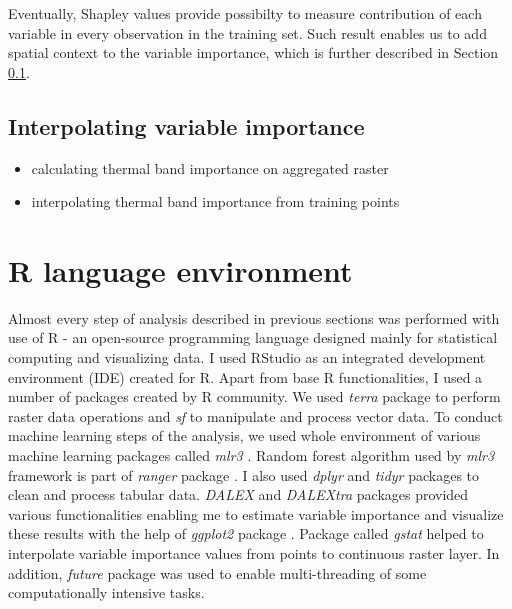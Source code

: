 \documentclass{amuthesis}
\begin{document}
Eventually, Shapley values provide possibilty to measure contribution of
each variable in every observation in the training set. Such result
enables us to add spatial context to the variable importance, which is
further described in Section \ref{sec-importance-interpolation}.

\hypertarget{sec-importance-interpolation}{%
\subsection{Interpolating variable
importance}\label{sec-importance-interpolation}}

\begin{itemize}
\item
  calculating thermal band importance on aggregated raster
\item
  interpolating thermal band importance from training points
\end{itemize}

\hypertarget{sec-r}{%
\section{R language environment}\label{sec-r}}

Almost every step of analysis described in previous sections was
performed with use of R \autocite{R-base} - an open-source programming
language designed mainly for statistical computing and visualizing data.
I used RStudio \autocite{rstudio_team_rstudio_2020} as an integrated
development environment (IDE) created for R. Apart from base R
functionalities, I used a number of packages created by R community. We
used \emph{terra} package \autocite{R-terra} to perform raster data
operations and \emph{sf} \autocite{R-sf} to manipulate and process
vector data. To conduct machine learning steps of the analysis, we used
whole environment of various machine learning packages called
\emph{mlr3} \autocite{R-mlr3}. Random forest algorithm used by
\emph{mlr3} framework is part of \emph{ranger} package
\autocite{R-ranger} . I also used \emph{dplyr} \autocite{R-dplyr} and
\emph{tidyr} packages \autocite{R-tidyr} to clean and process tabular
data. \emph{DALEX} \autocite{R-DALEX} and \emph{DALEXtra}
\autocite{R-DALEXtra} packages provided various functionalities enabling
me to estimate variable importance and visualize these results with the
help of \emph{ggplot2} package \autocite{R-ggplot2}. Package called
\emph{gstat} \autocite{R-gstat} helped to interpolate variable
importance values from points to continuous raster layer. In addition,
\emph{future} package \autocite{R-future} was used to enable
multi-threading of some computationally intensive tasks.
\end{document}
